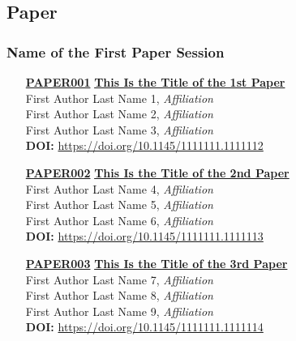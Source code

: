 
\subsection{Paper}
\subsubsection{Name of the First Paper Session}
\begin{enumerate}
\item[\href{https://doi.org/10.1145/1111111.1111112}{\textbf{PAPER001}}]
\href{https://doi.org/10.1145/1111111.1111112}{\textbf{This Is the Title of the 1st Paper}}\\
First Author Last Name 1, \emph{Affiliation}\\
First Author Last Name 2, \emph{Affiliation}\\
First Author Last Name 3, \emph{Affiliation}\\
\textbf{DOI:} \href{https://doi.org/10.1145/1111111.1111112}{https://doi.org/10.1145/1111111.1111112}\\

\item[\href{https://doi.org/10.1145/1111111.1111113}{\textbf{PAPER002}}]
\href{https://doi.org/10.1145/1111111.1111113}{\textbf{This Is the Title of the 2nd Paper}}\\
First Author Last Name 4, \emph{Affiliation}\\
First Author Last Name 5, \emph{Affiliation}\\
First Author Last Name 6, \emph{Affiliation}\\
\textbf{DOI:} \href{https://doi.org/10.1145/1111111.1111113}{https://doi.org/10.1145/1111111.1111113}\\

\item[\href{https://doi.org/10.1145/1111111.1111114}{\textbf{PAPER003}}]
\href{https://doi.org/10.1145/1111111.1111114}{\textbf{This Is the Title of the 3rd Paper}}\\
First Author Last Name 7, \emph{Affiliation}\\
First Author Last Name 8, \emph{Affiliation}\\
First Author Last Name 9, \emph{Affiliation}\\
\textbf{DOI:} \href{https://doi.org/10.1145/1111111.1111114}{https://doi.org/10.1145/1111111.1111114}\\


\end{enumerate}

